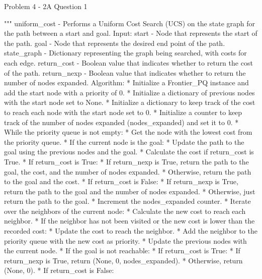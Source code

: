 \begin{problem}{Problem 4 - 2A Question 1}
\begin{highlight}[Solution]
\begin{code}[Python]
    """ uniform_cost - Performs a Uniform Cost Search (UCS) on the state graph for the path between a start and goal.
        Input:
            start - Node that represents the start of the path.
            goal - Node that represents the desired end point of the path.
            state_graph - Dictionary representing the graph being searched, with costs for each edge.
            return_cost - Boolean value that indicates whether to return the cost of the path.
            return_nexp - Boolean value that indicates whether to return the number of nodes expanded.
        Algorithm:
            * Initialize a Frontier_PQ instance and add the start node with a priority of 0.
            * Initialize a dictionary of previous nodes with the start node set to None.
            * Initialize a dictionary to keep track of the cost to reach each node with the start node set to 0.
            * Initialize a counter to keep track of the number of nodes expanded (nodes_expanded) and set it to 0.
            * While the priority queue is not empty:
                * Get the node with the lowest cost from the priority queue.
                * If the current node is the goal:
                    * Update the path to the goal using the previous nodes and the goal.
                    * Calculate the cost if return_cost is True.
                    * If return_cost is True:
                        * If return_nexp is True, return the path to the goal, the cost, and the number of nodes expanded.
                        * Otherwise, return the path to the goal and the cost.
                    * If return_cost is False:
                        * If return_nexp is True, return the path to the goal and the number of nodes expanded.
                        * Otherwise, just return the path to the goal.
                * Increment the nodes_expanded counter.
                * Iterate over the neighbors of the current node:
                    * Calculate the new cost to reach each neighbor.
                    * If the neighbor has not been visited or the new cost is lower than the recorded cost:
                        * Update the cost to reach the neighbor.
                        * Add the neighbor to the priority queue with the new cost as priority.
                        * Update the previous nodes with the current node.
            * If the goal is not reachable:
                * If return_cost is True:
                    * If return_nexp is True, return (None, 0, nodes_expanded).
                    * Otherwise, return (None, 0).
                * If return_cost is False:

\end{code}
\end{highlight}
\end{problem}
